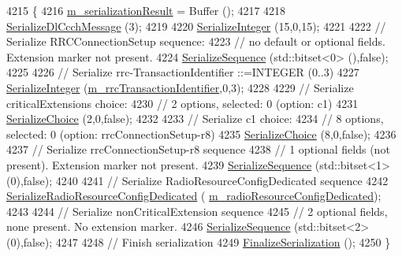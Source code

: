 \begin{DoxyCode}
4215 \{
4216   \hyperlink{classns3_1_1Asn1Header_a758b74023ea5bf40941af6f0a6a66058}{m\_serializationResult} = Buffer ();
4217 
4218   \hyperlink{classns3_1_1RrcDlCcchMessage_ad9df8191a3ee4f9e7f0343f5b515565f}{SerializeDlCcchMessage} (3);
4219 
4220   \hyperlink{classns3_1_1Asn1Header_ab1c3bd37730affa7473bc759d625c29a}{SerializeInteger} (15,0,15);
4221 
4222   \textcolor{comment}{// Serialize RRCConnectionSetup sequence:}
4223   \textcolor{comment}{// no default or optional fields. Extension marker not present.}
4224   \hyperlink{classns3_1_1Asn1Header_aa9744858380443ed95836fed08799aed}{SerializeSequence} (std::bitset<0> (),\textcolor{keyword}{false});
4225 
4226   \textcolor{comment}{// Serialize rrc-TransactionIdentifier ::=INTEGER (0..3)}
4227   \hyperlink{classns3_1_1Asn1Header_ab1c3bd37730affa7473bc759d625c29a}{SerializeInteger} (\hyperlink{classns3_1_1RrcConnectionSetupHeader_a623f0298c84418c5c03c19a070118583}{m\_rrcTransactionIdentifier},0,3);
4228 
4229   \textcolor{comment}{// Serialize criticalExtensions choice:}
4230   \textcolor{comment}{// 2 options, selected: 0 (option: c1)}
4231   \hyperlink{classns3_1_1Asn1Header_a400ef4a710499da80fc55e23a973d4fa}{SerializeChoice} (2,0,\textcolor{keyword}{false});
4232 
4233   \textcolor{comment}{// Serialize c1 choice:}
4234   \textcolor{comment}{// 8 options, selected: 0 (option: rrcConnectionSetup-r8)}
4235   \hyperlink{classns3_1_1Asn1Header_a400ef4a710499da80fc55e23a973d4fa}{SerializeChoice} (8,0,\textcolor{keyword}{false});
4236 
4237   \textcolor{comment}{// Serialize rrcConnectionSetup-r8 sequence}
4238   \textcolor{comment}{// 1 optional fields (not present). Extension marker not present.}
4239   \hyperlink{classns3_1_1Asn1Header_aa9744858380443ed95836fed08799aed}{SerializeSequence} (std::bitset<1> (0),\textcolor{keyword}{false});
4240 
4241   \textcolor{comment}{// Serialize RadioResourceConfigDedicated sequence}
4242   \hyperlink{classns3_1_1RrcAsn1Header_a21940b59764c933864f631482a6e4af0}{SerializeRadioResourceConfigDedicated} (
      \hyperlink{classns3_1_1RrcConnectionSetupHeader_a008ae6a31293cdd4ce73f4f082674fe2}{m\_radioResourceConfigDedicated});
4243 
4244   \textcolor{comment}{// Serialize nonCriticalExtension sequence}
4245   \textcolor{comment}{// 2 optional fields, none present. No extension marker.}
4246   \hyperlink{classns3_1_1Asn1Header_aa9744858380443ed95836fed08799aed}{SerializeSequence} (std::bitset<2> (0),\textcolor{keyword}{false});
4247 
4248   \textcolor{comment}{// Finish serialization}
4249   \hyperlink{classns3_1_1Asn1Header_a6c9bfaa54e5ca1a4eb8ea6c6b5550a8b}{FinalizeSerialization} ();
4250 \}
\end{DoxyCode}


